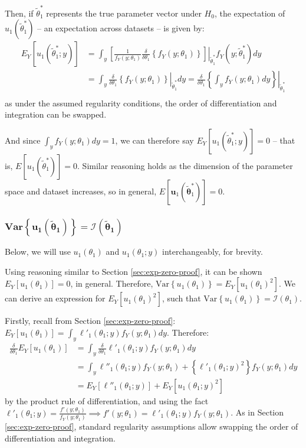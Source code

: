 \documentclass{article}
\newcommand{\thetaOneOD}{\theta_1}
\newcommand{\thetaOneTilde}{\tilde{\boldsymbol{\theta}}_1}
\newcommand{\scoreU}{\boldsymbol{u}_1 (\thetaOneTilde)}
\newcommand{\lrbr}[1]{\left\{ #1 \right\}}
\newcommand{\lrsq}[1]{\left[ #1 \right]}
\newcommand{\llSimpleFirstDeriv}{\ell'_1(\thetaOneOD; y)}
\newcommand{\llSimpleSecondDeriv}{\ell''_1(\thetaOneOD; y)}
\newcommand{\pdfSimple}{f_Y (y; \thetaOneOD)}
\newcommand{\pdfSimpleTrue}{f_Y (y; \thetaOneTildeODTrue)}
\newcommand{\scoreSimpleTrue}{u_1(\thetaOneTildeODTrue)}
\newcommand{\scoreSimpleTrueCond}{u_1(\thetaOneTildeODTrue; y)}
\newcommand{\scoreSimple}{u_1(\thetaOneOD)}
\newcommand{\scoreSimpleCond}{u_1(\thetaOneOD; y)}
\newcommand{\deltaThetaOneOD}{\frac{\delta}{\delta \thetaOneOD}}
\newcommand{\intSimple}{\int_y}
\newcommand{\thetaOneTildeODTrue}{\tilde{\theta}_1^*}
\begin{document}
Then, if $\thetaOneTildeODTrue$ represents the true parameter vector under
$H_0$, the expectation of $\scoreSimpleTrue$ -- an expectation
across datasets -- is given by:
\begin{equation*}
  \begin{split}
    E_Y\lrsq{\scoreSimpleTrueCond} & = \intSimple \left. \lrsq{\frac{1}{\pdfSimple}
        \deltaThetaOneOD \lrbr{\pdfSimple}} \right|_{\thetaOneTildeODTrue}
    \pdfSimpleTrue dy \\ 
    & = \intSimple \left. \deltaThetaOneOD \lrbr{\pdfSimple}
    \right|_{\thetaOneTildeODTrue} dy = \left. \deltaThetaOneOD \lrbr{\intSimple
        \pdfSimple dy} \right|_{\thetaOneTildeODTrue} \\
  \end{split}
\end{equation*}
as under the assumed regularity conditions, the order of
differentiation and integration can be swapped. 

And since $\intSimple \pdfSimple dy = 1$, we can therefore say
$E_Y[\scoreSimpleTrueCond]=0$ -- that is,
$E[\scoreSimpleTrue]=0$. Similar reasoning holds as the dimension of
the parameter space and dataset increases, so in general,
$E[\boldsymbol{u}_1(\thetaOneTilde^*)]=0$. 

\subsubsection*{$\boldsymbol{\text{Var}\lrbr{\scoreU} = \mathcal{I}(\thetaOneTilde)}$}
\label{sec:var-info-equiv-proof}

Below, we will
use $\scoreSimple$ and $\scoreSimpleCond$ interchangeably, for
brevity.

Using reasoning similar to Section \ref{sec:exp-zero-proof}, it can be
shown $E_Y [\scoreSimple] = 0$, in general. Therefore,
$\text{Var}\lrbr{\scoreSimple} = E_Y[\scoreSimple^2]$. We 
can derive an expression for $E_Y[\scoreSimple^2]$, such that 
$\text{Var}\lrbr{\scoreSimple} = \mathcal{I}(\thetaOneOD)$.

Firstly, recall from Section \ref{sec:exp-zero-proof}:
$E_Y[\scoreSimple] = \intSimple \llSimpleFirstDeriv \pdfSimple
dy$. Therefore:
\begin{equation*}
  \label{eq:exp-deriv}
  \begin{split}
  \deltaThetaOneOD E_Y[\scoreSimple] & = \intSimple \deltaThetaOneOD \llSimpleFirstDeriv \pdfSimple
  dy \\
  & = \intSimple \llSimpleSecondDeriv \pdfSimple + \lrbr{\llSimpleFirstDeriv^2}
  \pdfSimple dy \\
  & = E_Y[\llSimpleSecondDeriv] + E_Y[\scoreSimpleCond^2]
  \end{split}
\end{equation*}
by the product rule of differentiation, and using the fact
$\llSimpleFirstDeriv = \frac{f'(y;\thetaOneOD)}{\pdfSimple} \implies
f'(y;\thetaOneOD) = \llSimpleFirstDeriv \pdfSimple$. As in
Section \ref{sec:exp-zero-proof}, standard regularity assumptions
allow swapping the order of differentiation and integration.
\end{document}
